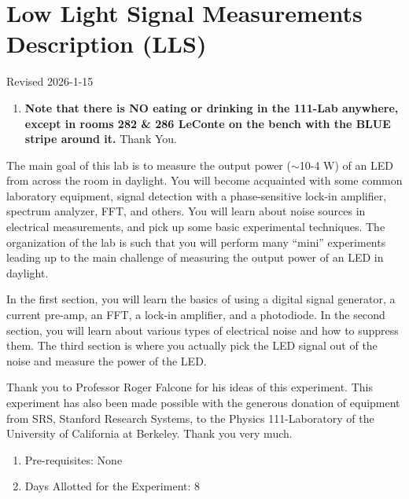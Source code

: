 \documentclass{../lab}
\begin{document}
\maketitle

\tableofcontents

\section{Low Light Signal Measurements Description (LLS)}

Revised 2026-1-15

\begin{enumerate}
    \item \textbf{Note that there is NO eating or drinking in the 111-Lab anywhere, except in rooms 282 \& 286 LeConte on the bench with the BLUE stripe around it.} Thank You.

\end{enumerate}

The main goal of this lab is to measure the output power ($\sim$10-4 W) of an LED from across the room in daylight. You will become acquainted with some common laboratory equipment, signal detection with a phase-sensitive lock-in amplifier, spectrum analyzer, FFT, and others. You will learn about noise sources in electrical measurements, and pick up some basic experimental techniques. The organization of the lab is such that you will perform many ``mini'' experiments leading up to the main challenge of measuring the output power of an LED in daylight.

In the first section, you will learn the basics of using a digital signal generator, a current pre-amp, an FFT, a lock-in amplifier, and a photodiode. In the second section, you will learn about various types of electrical noise and how to suppress them. The third section is where you actually pick the LED signal out of the noise and measure the power of the LED.

Thank you to Professor Roger Falcone for his ideas of this experiment. This experiment has also been made possible with the generous donation of equipment from SRS, Stanford Research Systems, to the Physics 111-Laboratory of the University of California at Berkeley. Thank you very much.

\begin{enumerate}
    \item Pre-requisites: None

    \item Days Allotted for the Experiment: 8

\end{enumerate}
\end{document}
